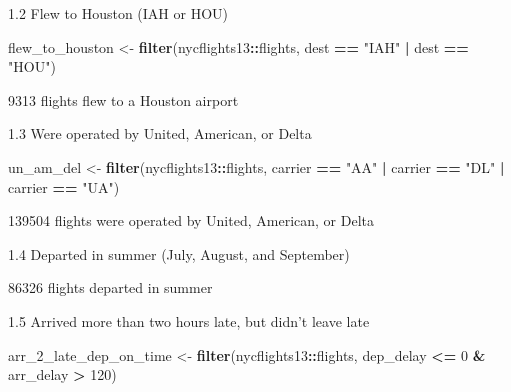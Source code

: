 \documentclass[
]{book}
\newenvironment{Shaded}{\begin{snugshade}}{\end{snugshade}}
\newcommand{\DecValTok}[1]{\textcolor[rgb]{0.00,0.00,0.81}{#1}}
\newcommand{\KeywordTok}[1]{\textcolor[rgb]{0.13,0.29,0.53}{\textbf{#1}}}
\newcommand{\NormalTok}[1]{#1}
\newcommand{\OperatorTok}[1]{\textcolor[rgb]{0.81,0.36,0.00}{\textbf{#1}}}
\newcommand{\StringTok}[1]{\textcolor[rgb]{0.31,0.60,0.02}{#1}}
\begin{document}
1.2 Flew to Houston (IAH or HOU)

\begin{Shaded}
\begin{Highlighting}[]
\NormalTok{flew_to_houston <-}\StringTok{ }\KeywordTok{filter}\NormalTok{(nycflights13}\OperatorTok{::}\NormalTok{flights, dest }\OperatorTok{==}\StringTok{ "IAH"} \OperatorTok{|}\StringTok{ }\NormalTok{dest }\OperatorTok{==}\StringTok{ "HOU"}\NormalTok{)}
\end{Highlighting}
\end{Shaded}

9313 flights flew to a Houston airport

1.3 Were operated by United, American, or Delta

\begin{Shaded}
\begin{Highlighting}[]
\NormalTok{un_am_del <-}\StringTok{ }\KeywordTok{filter}\NormalTok{(nycflights13}\OperatorTok{::}\NormalTok{flights, carrier }\OperatorTok{==}\StringTok{ "AA"} \OperatorTok{|}\StringTok{ }\NormalTok{carrier }\OperatorTok{==}\StringTok{ "DL"} \OperatorTok{|}\StringTok{ }\NormalTok{carrier }\OperatorTok{==}\StringTok{ "UA"}\NormalTok{)}
\end{Highlighting}
\end{Shaded}

139504 flights were operated by United, American, or Delta

1.4 Departed in summer (July, August, and September)

\begin{Shaded}
\end{Shaded}

86326 flights departed in summer

1.5 Arrived more than two hours late, but didn't leave late

\begin{Shaded}
\begin{Highlighting}[]
\NormalTok{arr_}\DecValTok{2}\NormalTok{_late_dep_on_time <-}\StringTok{ }\KeywordTok{filter}\NormalTok{(nycflights13}\OperatorTok{::}\NormalTok{flights, dep_delay }\OperatorTok{<=}\StringTok{ }\DecValTok{0} \OperatorTok{&}\StringTok{ }\NormalTok{arr_delay }\OperatorTok{>}\StringTok{ }\DecValTok{120}\NormalTok{)}
\end{Highlighting}
\end{Shaded}
\end{document}
